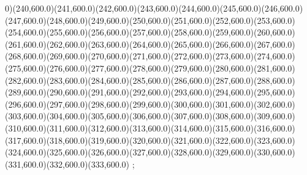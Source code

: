{0)(240,600.0)(241,600.0)(242,600.0)(243,600.0)(244,600.0)(245,600.0)(246,600.0)(247,600.0)(248,600.0)(249,600.0)(250,600.0)(251,600.0)(252,600.0)(253,600.0)(254,600.0)(255,600.0)(256,600.0)(257,600.0)(258,600.0)(259,600.0)(260,600.0)(261,600.0)(262,600.0)(263,600.0)(264,600.0)(265,600.0)(266,600.0)(267,600.0)(268,600.0)(269,600.0)(270,600.0)(271,600.0)(272,600.0)(273,600.0)(274,600.0)(275,600.0)(276,600.0)(277,600.0)(278,600.0)(279,600.0)(280,600.0)(281,600.0)(282,600.0)(283,600.0)(284,600.0)(285,600.0)(286,600.0)(287,600.0)(288,600.0)(289,600.0)(290,600.0)(291,600.0)(292,600.0)(293,600.0)(294,600.0)(295,600.0)(296,600.0)(297,600.0)(298,600.0)(299,600.0)(300,600.0)(301,600.0)(302,600.0)(303,600.0)(304,600.0)(305,600.0)(306,600.0)(307,600.0)(308,600.0)(309,600.0)(310,600.0)(311,600.0)(312,600.0)(313,600.0)(314,600.0)(315,600.0)(316,600.0)(317,600.0)(318,600.0)(319,600.0)(320,600.0)(321,600.0)(322,600.0)(323,600.0)(324,600.0)(325,600.0)(326,600.0)(327,600.0)(328,600.0)(329,600.0)(330,600.0)(331,600.0)(332,600.0)(333,600.0)
};
